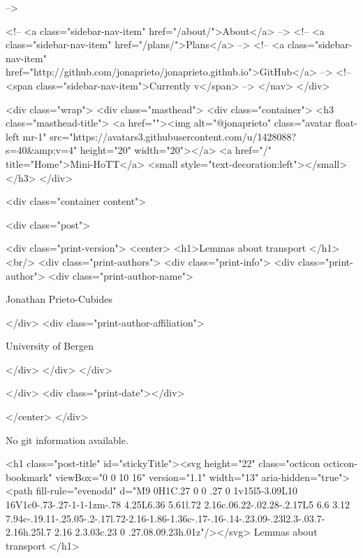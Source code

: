       
     -->

    <!-- <a class="sidebar-nav-item" href="/about/">About</a> -->
    <!-- <a class="sidebar-nav-item" href="/plans/">Plans</a> -->
    <!-- <a class="sidebar-nav-item" href="http://github.com/jonaprieto/jonaprieto.github.io">GitHub</a> -->
    <!-- <span class="sidebar-nav-item">Currently v</span> -->
  </nav>
</div>

    <div class="wrap">
      <div class="masthead">
        <div class="container">
          <h3 class="masthead-title">
            <a href=""><img alt="@jonaprieto" class="avatar float-left mr-1" src="https://avatars3.githubusercontent.com/u/1428088?s=40&amp;v=4" height="20" width="20"></a>
            <a href="/" title="Home">Mini-HoTT</a>
            <small style="text-decoration:left"></small>
          </h3>
        </div>
      
      <div class="container content">
        







<div class="post">

  <div class="print-version">
    <center>
      <h1>Lemmas about transport </h1><br/>
        <div class="print-authors">
          <div class="print-info">
            <div class="print-author">
              <div class="print-author-name">
                
                  Jonathan Prieto-Cubides
                
              </div>
              <div class="print-author-affiliation">
                
                  University of Bergen
                
                </div>
            </div>
          </div>
          
          
        </div>
        <div class="print-date"></div>
        
        
    </center>
  </div>

  
  No git information available.
  
  <h1 class="post-title" id="stickyTitle"><svg height="22" class="octicon octicon-bookmark" viewBox="0 0 10 16" version="1.1" width="13" aria-hidden="true"><path fill-rule="evenodd" d="M9 0H1C.27 0 0 .27 0 1v15l5-3.09L10 16V1c0-.73-.27-1-1-1zm-.78 4.25L6.36 5.61l.72 2.16c.06.22-.02.28-.2.17L5 6.6 3.12 7.94c-.19.11-.25.05-.2-.17l.72-2.16-1.86-1.36c-.17-.16-.14-.23.09-.23l2.3-.03.7-2.16h.25l.7 2.16 2.3.03c.23 0 .27.08.09.23h.01z"/></svg> Lemmas about transport 
  </h1>

